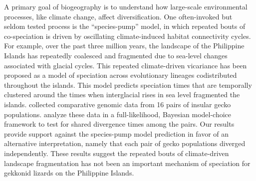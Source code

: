A primary goal of biogeography is to understand how large-scale environmental
processes, like climate change, affect diversification.
One often-invoked but seldom tested process is the  ``species-pump''
model, in which repeated bouts of co-speciation is driven by oscillating
climate-induced habitat connectivity cycles.
For example, over the past three million years, the landscape of the Philippine
Islands has repeatedly coalesced and fragmented due to sea-level changes
associated with  glacial cycles.
This repeated climate-driven vicariance has been proposed as a model of
speciation across evolutionary lineages codistributed throughout the islands.
This model predicts speciation times that are temporally clustered around
the times when interglacial rises in sea level fragmented the islands.
 collected comparative genomic data from 16 pairs of insular gecko populations.
 analyze these data in a full-likelihood, Bayesian model-choice
framework to test for shared divergence times among the pairs.
Our results provide support against the species-pump model prediction in favor
of an alternative interpretation, namely that each pair of gecko populations
diverged independently.
These results suggest the repeated bouts of climate-driven landscape
fragmentation has not been an important mechanism of speciation for
gekkonid lizards on the Philippine Islands.

